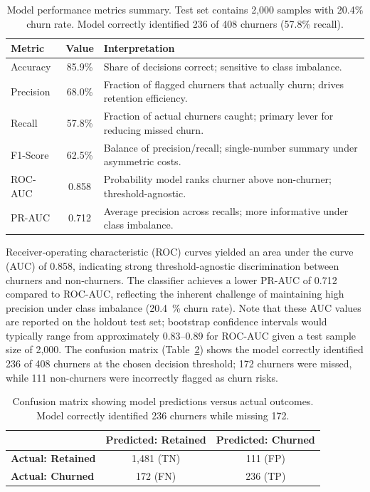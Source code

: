 \documentclass[12pt]{article}
\begin{document}
\begin{table}[H]
\centering
\small
\caption{Model performance metrics summary. Test set contains 2,000 samples with 20.4\% churn rate. Model correctly identified 236 of 408 churners (57.8\% recall).}
\label{tab:model_performance}
\begin{tabular}{lcp{9.5cm}}
\toprule
\textbf{Metric} & \textbf{Value} & \textbf{Interpretation} \\
\midrule
Accuracy & 85.9\% & Share of decisions correct; sensitive to class imbalance. \\
\cmidrule(lr){1-3}
Precision & 68.0\% & Fraction of flagged churners that actually churn; drives retention efficiency. \\
\cmidrule(lr){1-3}
Recall & 57.8\% & Fraction of actual churners caught; primary lever for reducing missed churn. \\
\cmidrule(lr){1-3}
F1-Score & 62.5\% & Balance of precision/recall; single-number summary under asymmetric costs. \\
\cmidrule(lr){1-3}
ROC-AUC & 0.858 & Probability model ranks churner above non-churner; threshold-agnostic. \\
\cmidrule(lr){1-3}
PR-AUC & 0.712 & Average precision across recalls; more informative under class imbalance. \\
\bottomrule
\end{tabular}
\end{table}

Receiver‑operating characteristic (ROC) curves yielded an area under the curve (AUC) of 0.858, indicating strong threshold-agnostic discrimination between churners and non‑churners. The classifier achieves a lower PR-AUC of 0.712 compared to ROC-AUC, reflecting the inherent challenge of maintaining high precision under class imbalance (20.4~\% churn rate). Note that these AUC values are reported on the holdout test set; bootstrap confidence intervals would typically range from approximately 0.83–0.89 for ROC-AUC given a test sample size of 2,000. The confusion matrix (Table~\ref{tab:confusion_matrix}) shows the model correctly identified 236 of 408 churners at the chosen decision threshold; 172 churners were missed, while 111 non-churners were incorrectly flagged as churn risks.

\begin{table}[H]
\centering
\small
\caption{Confusion matrix showing model predictions versus actual outcomes. Model correctly identified 236 churners while missing 172.}
\label{tab:confusion_matrix}
\begin{tabular}{lcc}
\toprule
& \textbf{Predicted: Retained} & \textbf{Predicted: Churned} \\
\midrule
\textbf{Actual: Retained} & 1,481 (TN) & 111 (FP) \\
\textbf{Actual: Churned} & 172 (FN) & 236 (TP) \\
\bottomrule
\end{tabular}
\end{table}
\end{document}
